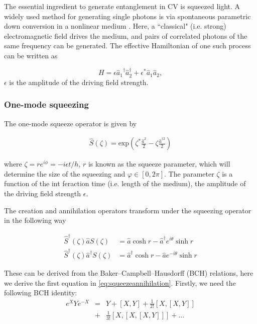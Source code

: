 \documentclass[pra,
superscriptaddress,
 amsmath,amssymb,
 aps,twocolumn]{revtex4-1}
\begin{document}
The essential ingredient to generate entanglement in CV is squeezed light. A widely used method for generating single photons is via spontaneous parametric down conversion in a nonlinear medium \cite{bib:PhysRevLett.75.4337, bib:o2009photonic}. Here, a ``classical" (i.e. strong) electromagnetic field drives the medium, and pairs of correlated photons of the same frequency can be generated.
The effective Hamiltonian of one such process can be written as

\begin{equation}
H = \epsilon {\hat a_1}^\dagger  \hat a_{2} ^\dagger + \epsilon^* \hat a_1 \hat a_2,
\end{equation}
\noindent $\epsilon$ is the amplitude of the driving field strength.
% 


\subsubsection{One-mode squeezing}
The one-mode squeeze operator is given by

\begin{align}
\hat S(\zeta) = \text{exp} (\zeta^* \frac{\hat   a ^2}{2} -\zeta \frac{\hat  a ^{\dagger 2} }{2})
\end{align}

\noindent where $\zeta  = r e^{i \phi}= - i \epsilon t/h $, $r$ is known as the squeeze parameter, which will determine the size of the squeezing and $\varphi \in [0, 2\pi]$. The parameter $\zeta$ is a function of the int feraction time (i.e. length of the medium), the amplitude of the driving field strength $\epsilon$.

The creation and annihilation operators transform under the squeezing operator in the following way

\begin{align}
\hat S^\dagger(\zeta) \hat a S(\zeta) &= \hat a \cosh r - \hat a^\dagger e^{i \theta}\sinh r \\
% 
\hat S^\dagger(\zeta) \hat a^\dagger S(\zeta) &= \hat a ^\dagger \cosh r - \hat a  e^{-i \theta} \sinh r
\label{eq:squeezeannihilation}
\end{align}

\noindent These can be derived from the Baker–Campbell–Hausdorff (BCH) relations, here we derive the first equation in \eqref{eq:squeezeannihilation}. Firstly, we need the following BCH identity:
% 
\begin{eqnarray}
e^X Y e^{-X} &=& Y + [X,Y] + \frac{1}{2!}[X,[X,Y]] \nonumber \\
             &+& \frac{1}{3!}[X,[X,[X,Y]]]+ ...
\end{eqnarray}
\end{document}
